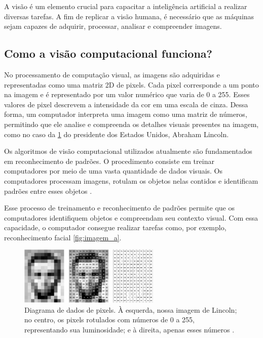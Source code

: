 A visão é um elemento crucial para capacitar a inteligência artificial a realizar diversas tarefas. A fim de replicar a visão humana, é necessário que as máquinas sejam capazes de adquirir, processar, analisar e compreender imagens. \cite{como_funciona_visao_computacional}




\subsection*{Como a visão computacional funciona?}

No processamento de computação visual, as imagens são adquiridas e representadas como uma matriz 2D de pixels. Cada pixel corresponde a um ponto na imagem e é representado por um valor numérico que varia de 0 a 255. Esses valores de pixel descrevem a intensidade da cor em uma escala de cinza. Dessa forma, um computador interpreta uma imagem como uma matriz de números, permitindo que ele analise e compreenda os detalhes visuais presentes na imagem, como no caso da \cref{fig:comp_vision} do presidente dos Estados Unidos, Abraham Lincoln\cite{mit_video}.

Os algoritmos de visão computacional utilizados atualmente são fundamentados em reconhecimento de padrões. O procedimento consiste em treinar computadores por meio de uma vasta quantidade de dados visuais. Os computadores processam imagens, rotulam os objetos nelas contidos e identificam padrões entre esses objetos \cite{content_Human_Vision}.

Esse processo de treinamento e reconhecimento de padrões permite que os computadores identifiquem objetos e compreendam seu contexto visual. Com essa capacidade, o computador consegue realizar tarefas como, por exemplo, reconhecimento facial \cref{fig:imagem_a}.

\begin{figure}[!ht]
	\centering
	\includegraphics[width=0.6\textwidth]{figures/lincoln_pixel_values.png}
	\caption{Diagrama de dados de pixels. À esquerda, nossa imagem de Lincoln; no centro, os pixels rotulados com números de 0 a 255, representando sua luminosidade; e à direita, apenas esses números \cite{content_Human_Vision}.}
	\label{fig:comp_vision}
\end{figure}



